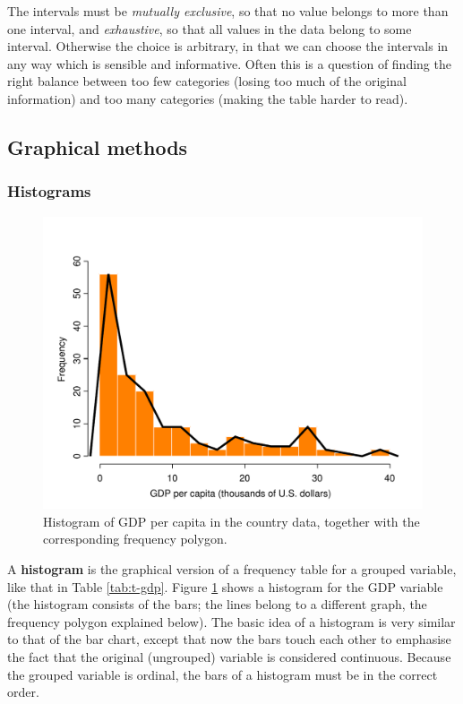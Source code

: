 \documentclass[11pt,a4paper,openany]{book}
\begin{document}
The intervals must be \emph{mutually exclusive}, so that no value
belongs to more than one interval, and \emph{exhaustive}, so that all
values in the data belong to some interval. Otherwise the choice is
arbitrary, in that we can choose the intervals in any way which is
sensible and informative. Often this is a question of finding the right
balance between too few categories (losing too much of the original
information) and too many categories (making the table harder to read).

\subsection{Graphical methods}\label{ss-descr1-1cont-graphs}

\subsubsection*{Histograms}\label{histograms}

\begin{figure}[htbp]
\centering
\includegraphics[width=13.50000cm]{gdp.pdf}
\caption{\label{fig:f-hist-gdp} Histogram of GDP per capita in the country
data, together with the corresponding frequency polygon.}
\end{figure}

A \textbf{histogram} is the graphical version of a frequency table for a
grouped variable, like that in Table \ref{tab:t-gdp}. Figure
\ref{fig:f-hist-gdp} shows a histogram for the GDP variable (the
histogram consists of the bars; the lines belong to a different graph,
the frequency polygon explained below). The basic idea of a histogram is
very similar to that of the bar chart, except that now the bars touch
each other to emphasise the fact that the original (ungrouped) variable
is considered continuous. Because the grouped variable is ordinal, the
bars of a histogram must be in the correct order.
\end{document}
